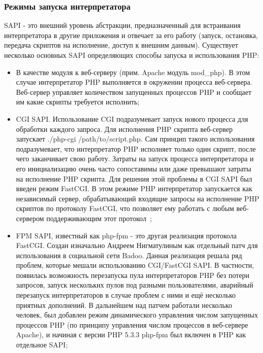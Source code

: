 \subsubsection{Режимы запуска интерпретатора }
\label{sub:practice:extebtions_php}

SAPI - это внешний уровень абстракции, предназначенный для встраивания интерпретатора в другие приложения и отвечает за его работу (запуск, остановка, передача скриптов на исполнение, доступ к внешним данным). Существует несколько основных SAPI определяющих способы запуска и использования PHP:

\begin{itemize}
    \item   В качестве модуля к веб-серверу (прим. Apache модуль mod\_php). В этом случае интерпретатор PHP выполняется в окружении процесса веб-сервера. Веб-сервер управляет количеством запущенных процессов PHP и сообщает им какие скрипты требуется исполнить;

    \item   CGI SAPI. Использование CGI подразумевает запуск нового процесса для обработки каждого запроса. Для исполнения PHP скрипта веб-сервер запускает ./php-cgi /path/to/script.php. Сам принцип такого использования подразумевает, что интерпретатор PHP исполняет только один скрипт, после чего заканчивает свою работу. Затраты на запуск процесса интерпретатора и его инициализацию очень часто сопоставимы или даже превышают затраты на исполнение PHP скрипта. Для решения этой проблемы в CGI SAPI был введен режим FastCGI. В этом режиме PHP интерпретатор запускается как независимый сервер, обрабатывающий входящие запросы на исполнение PHP скриптов по протоколу FastCGI, что позволяет ему работать с любым веб-сервером поддерживающим этот протокол~\cite{php_documents};

    \item   FPM SAPI, известный как php-fpm - это другая реализация протокола FastCGI. Создан изначально Андреем Нигматулиным как отдельный патч для использования в социальной сети Badoo. Данная реализация решала ряд проблем, которые мешали использованию CGI/FastCGI SAPI. В частности, появилась возможность перезапуска пула интерпретаторов PHP без потери запросов, запуск нескольких пулов под разными пользователями, аварийный перезапуск интерпретаторов в случае проблем с ними и ещё несколько приятных дополнений. В дальнейшем над патчем работали несколько человек, был добавлен режим динамического управления числом запущенных процессов PHP (по принципу управления числом процессов в веб-сервере Apache), и начиная с версии PHP 5.3.3 php-fpm был включен в PHP как отдельное SAPI;


\end{itemize}
